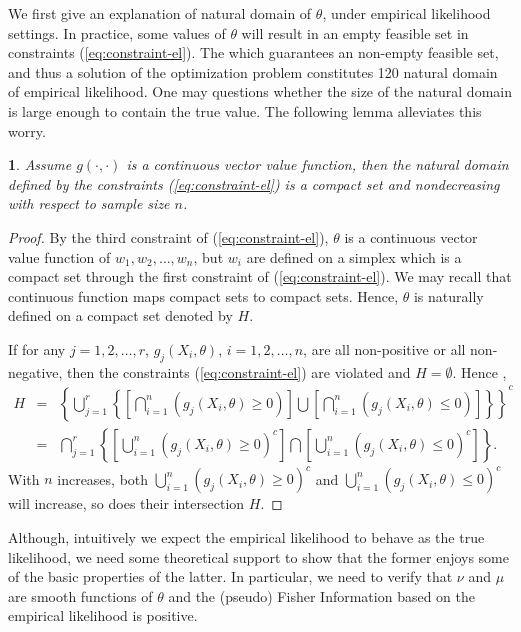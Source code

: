 \documentclass[oneside,english]{amsbook}
\numberwithin{section}{chapter}
\numberwithin{equation}{section}
\numberwithin{figure}{section}
\theoremstyle{plain}
\newtheorem{lem}{\protect\lemmaname}
\theoremstyle{plain}
\theoremstyle{definition}
\theoremstyle{plain}
\theoremstyle{plain}
\theoremstyle{remark}
\theoremstyle{definition}
\theoremstyle{definition}
\providecommand{\lemmaname}{Lemma}
\begin{document}
We first give an explanation of natural domain of $\theta$, under
empirical likelihood settings. In practice, some values of $\theta$
will result in an empty feasible set in constraints (\ref{eq:constraint-el}).
The which guarantees an non-empty feasible set, and thus a solution
of the optimization problem constitutes 120 natural domain of empirical
likelihood. One may questions whether the size of the natural domain
is large enough to contain the true value. The following lemma alleviates
this worry.
\begin{lem}
\label{lem:nondecreasing-compact-natural-domain}Assume $g\left(\cdot,\cdot\right)$
is a continuous vector value function, then the natural domain defined
by the constraints (\ref{eq:constraint-el}) is a compact set and
nondecreasing with respect to sample size $n$.\end{lem}
\begin{proof}
By the third constraint of (\ref{eq:constraint-el}), $\theta$ is
a continuous vector value function of $w_{1},w_{2},\ldots,w_{n}$,
but $w_{i}$ are defined on a simplex which is a compact set through
the first constraint of (\ref{eq:constraint-el}). We may recall that
continuous function maps compact sets to compact sets. Hence, $\theta$
is naturally defined on a compact set denoted by $H$.

If for any $j=1,2,\ldots,r$, $g_{j}\left(X_{i},\theta\right)$, $i=1,2,\ldots,n$,
are all non-positive or all non-negative, then the constraints (\ref{eq:constraint-el})
are violated and $H=\emptyset$. Hence ,
\begin{eqnarray*}
H & = & \left\{ \bigcup_{j=1}^{r}\left\{ \left[\bigcap_{i=1}^{n}\left(g_{j}\left(X_{i},\theta\right)\ge0\right)\right]\bigcup\left[\bigcap_{i=1}^{n}\left(g_{j}\left(X_{i},\theta\right)\le0\right)\right]\right\} \right\} ^{c}\\
 & = & \bigcap_{j=1}^{r}\left\{ \left[\bigcup_{i=1}^{n}\left(g_{j}\left(X_{i},\theta\right)\ge0\right)^{c}\right]\bigcap\left[\bigcup_{i=1}^{n}\left(g_{j}\left(X_{i},\theta\right)\le0\right)^{c}\right]\right\} .
\end{eqnarray*}
With $n$ increases, both $\bigcup_{i=1}^{n}\left(g_{j}\left(X_{i},\theta\right)\ge0\right)^{c}$
and $\bigcup_{i=1}^{n}\left(g_{j}\left(X_{i},\theta\right)\le0\right)^{c}$
will increase, so does their intersection $H$. 
\end{proof}
Although, intuitively we expect the empirical likelihood to behave
as the true likelihood, we need some theoretical support to show that
the former enjoys some of the basic properties of the latter. In particular,
we need to verify that $\nu$ and $\mu$ are smooth functions of $\theta$
and the (pseudo) Fisher Information based on the empirical likelihood
is positive. 
\end{document}
